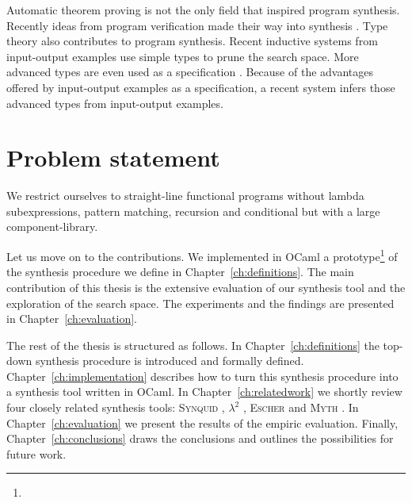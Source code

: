 Automatic theorem proving is not the only field that inspired program synthesis. Recently ideas from program verification made their way into synthesis \cite{LeonPaper,DBLP:journals/corr/InalaQLS15,Kuncak:2010:CFS:1806596.1806632}. Type theory also contributes to program synthesis. Recent inductive systems from input-output examples \cite{LambdaSquarePaper,MythPaper} use simple types to prune the search space. More advanced types are even used as a specification \cite{SynquidPaper}. Because of the advantages offered by input-output examples as a specification, a recent system \cite{Frankle:2016:EST:2837614.2837629} infers those advanced types from input-output examples.


\section{Problem statement}

We restrict ourselves to straight-line functional programs without lambda subexpressions, pattern matching, recursion and conditional but with a large component-library.



Let us move on to the contributions. We implemented in OCaml a prototype\footnote{} of the synthesis procedure we define in Chapter~\ref{ch:definitions}. The main contribution of this thesis is the extensive evaluation of our synthesis tool and the exploration of the search space. The experiments and the findings are presented in Chapter~\ref{ch:evaluation}.

The rest of the thesis is structured as follows. In Chapter~\ref{ch:definitions} the top-down synthesis procedure is introduced and formally defined. Chapter~\ref{ch:implementation} describes how to turn this synthesis procedure into a synthesis tool written in OCaml. In Chapter~\ref{ch:relatedwork} we shortly review four closely related synthesis tools: \textsc{Synquid} \cite{SynquidPaper}, $\lambda^2$ \cite{LambdaSquarePaper}, \textsc{Escher} \cite{EscherPaper} and \textsc{Myth} \cite{MythPaper}. In Chapter~\ref{ch:evaluation} we present the results of the empiric evaluation. Finally, Chapter~\ref{ch:conclusions} draws the conclusions and outlines the possibilities for future work.




